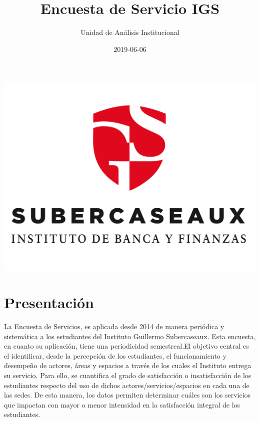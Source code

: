 \documentclass[]{book}
\title{Encuesta de Servicio IGS}
\author{Unidad de Análisis Institucional}
\date{2019-06-06}
\begin{document}
\maketitle

{
\setcounter{tocdepth}{1}
\tableofcontents
}
\chapter*{}\label{section}

\begin{center}\includegraphics{images/logoieb} \end{center}

\chapter*{Presentación}\label{presentacion}

La Encuesta de Servicios, es aplicada desde 2014 de manera periódica y
sistemática a los estudiantes del Instituto Guillermo Subercaseaux. Esta
encuesta, en cuanto su aplicación, tiene una periodicidad semestreal.El
objetivo central es el identificar, desde la percepción de los
estudiantes, el funcionamiento y desempeño de actores, áreas y espacios
a través de los cuales el Instituto entrega su servicio. Para ello, se
cuantifica el grado de satisfacción o insatisfacción de los estudiantes
respecto del uso de dichos actores/servicios/espacios en cada una de las
sedes. De esta manera, los datos permiten determinar cuáles son los
servicios que impactan con mayor o menor intensidad en la satisfacción
integral de los estudiantes.
\end{document}
